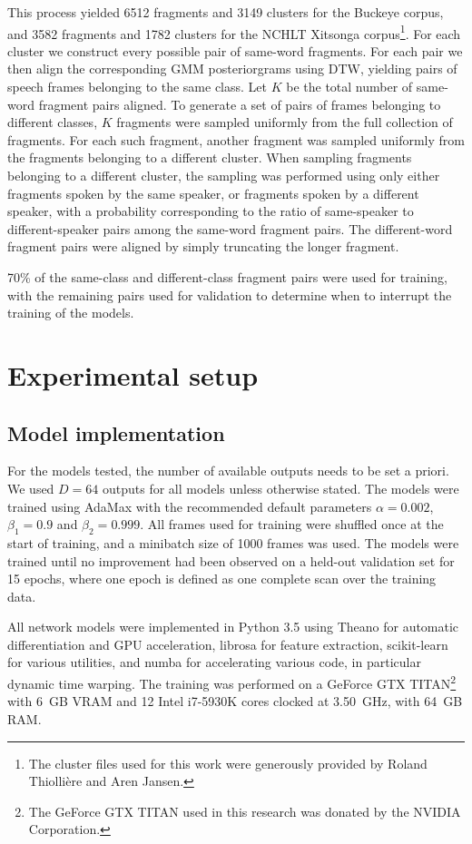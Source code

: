 This process yielded 6512 fragments and 3149 clusters for the Buckeye corpus, and 3582 fragments and 1782 clusters for the NCHLT Xitsonga corpus\footnote{The cluster files used for this work were generously provided by Roland Thiollière and Aren Jansen.}.
For each cluster we construct every possible pair of same-word fragments.
For each pair we then align the corresponding GMM posteriorgrams using DTW, yielding pairs of speech frames belonging to the same class.
Let $K$ be the total number of same-word fragment pairs aligned.
To generate a set of pairs of frames belonging to different classes, $K$ fragments were sampled uniformly from the full collection of fragments.
For each such fragment, another fragment was sampled uniformly from the fragments belonging to a different cluster.
When sampling fragments belonging to a different cluster, the sampling was performed using only either fragments spoken by the same speaker, or fragments spoken by a different speaker, with a probability corresponding to the ratio of same-speaker to different-speaker pairs among the same-word fragment pairs.
The different-word fragment pairs were aligned by simply truncating the longer fragment.

70\% of the same-class and different-class fragment pairs were used for training, with the remaining pairs used for validation to determine when to interrupt the training of the models.

\section{Experimental setup}
\subsection{Model implementation}

For the models tested, the number of available outputs needs to be set a priori.
We used $D = 64$ outputs for all models unless otherwise stated.
The models were trained using AdaMax \parencite{kingma2014adam} with the recommended default parameters $\alpha = 0.002$, $\beta_1 = 0.9$ and $\beta_2 = 0.999$.
All frames used for training were shuffled once at the start of training, and a minibatch size of 1000 frames was used.
The models were trained until no improvement had been observed on a held-out validation set for 15 epochs, where one epoch is defined as one complete scan over the training data.

All network models were implemented in Python 3.5 using Theano \parencite{theano} for automatic differentiation and GPU acceleration, librosa \parencite{librosa} for feature extraction, scikit-learn \parencite{scikit-learn} for various utilities, and numba \parencite{numba} for accelerating various code, in particular dynamic time warping.
The training was performed on a GeForce GTX TITAN\footnote{The GeForce GTX TITAN used in this research was donated by the NVIDIA Corporation.} with 6~GB VRAM and 12 Intel i7-5930K cores clocked at 3.50~GHz, with 64~GB RAM.

